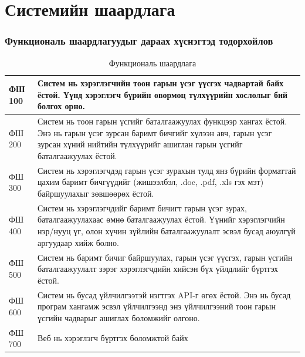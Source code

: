 \section{Системийн шаардлага}
\subsubsection{Функциональ шаардлагуудыг дараах хүснэгтэд тодорхойлов}
\begin{table}[h]
	\centering
	\caption{Функциональ шаардлага}
	\begin{tabular}{ |p{2cm}|p{13cm}| }
		\hline
		ФШ 100 & Систем нь хэрэглэгчийн тоон гарын үсэг үүсгэх чадвартай байх ёстой. Үүнд хэрэглэгч бүрийн өвөрмөц түлхүүрийн хослолыг бий болгох орно.                                                                             \\ \hline
		ФШ 200 & Систем нь тоон гарын үсгийг баталгаажуулах функцээр хангах ёстой. Энэ нь гарын үсэг зурсан баримт бичгийг хүлээн авч, гарын үсэг зурсан хүний нийтийн түлхүүрийг ашиглан гарын үсгийг баталгаажуулах ёстой.        \\ \hline
		ФШ 300 & Систем нь хэрэглэгчдэд гарын үсэг зурахын тулд янз бүрийн форматтай цахим баримт бичгүүдийг (жишээлбэл, .doc, .pdf, .xls гэх мэт) байршуулахыг зөвшөөрөх ёстой.                                                    \\ \hline
		ФШ 400 & Систем нь хэрэглэгчдийг баримт бичигт гарын үсэг зурах, баталгаажуулахаас өмнө баталгаажуулах ёстой. Үүнийг хэрэглэгчийн нэр/нууц үг, олон хүчин зүйлийн баталгаажуулалт эсвэл бусад аюулгүй аргуудаар хийж болно. \\ \hline
		ФШ 500 & Систем нь баримт бичиг байршуулах, гарын үсэг үүсгэх, гарын үсгийн баталгаажуулалт зэрэг хэрэглэгчдийн хийсэн бүх үйлдлийг бүртгэх ёстой.                                                                          \\ \hline
		ФШ 600 & Систем нь бусад үйлчилгээтэй нэгтгэх API-г өгөх ёстой. Энэ нь бусад програм хангамж эсвэл үйлчилгээнд энэ үйлчилгээний тоон гарын үсгийн чадварыг ашиглах боломжийг олгоно.                                        \\  \hline
		ФШ 700 & Веб нь хэрэглэгч бүртгэх боломжтой байх                                                                                                                                                                            \\ \hline
	\end{tabular}
\end{table}
\pagebreak
